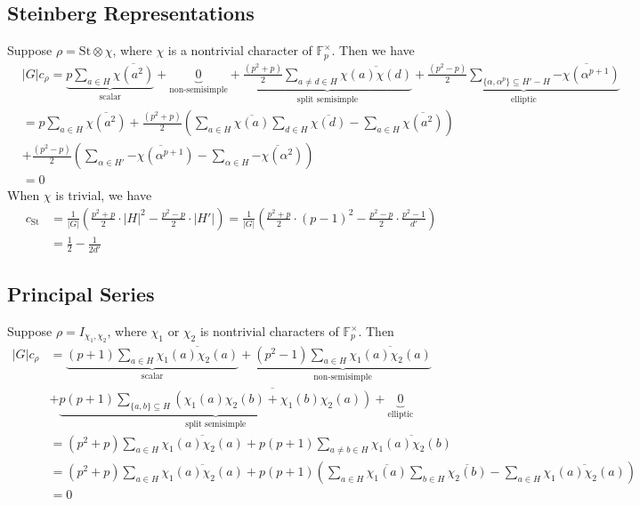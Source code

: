 \documentclass[12pt,reqno]{amsart}
\theoremstyle{plain}
\theoremstyle{definition}
\theoremstyle{remark}
\newcommand{\FF}{\mathbb{F}}
\begin{document}
\subsection{Steinberg Representations}
 Suppose $\rho = \mathrm{St}\otimes \chi$, where $\chi$ is a nontrivial character of $\FF_p^\times$. Then we have 
 \begin{align*}
     & |G|c_{\rho} =  \underbrace{p \sum_{a \in H} \overline{\chi(a^2)}}_{\text{scalar}}+\underbrace{0}_{\text{non-semisimple}}+ \underbrace{\frac{(p^2+p)}{2} \sum_{a \neq d  \in H} \overline{\chi(a) \chi(d)}}_{\text{split semisimple}} + \underbrace{\frac{(p^2-p)}{2} \sum_{\{\alpha, \alpha^p\} \subseteq H'-H}  \overline{-\chi(\alpha^{p+1})}}_{\text{elliptic}} \\
     &=   p \sum_{a \in H} \overline{\chi(a^2)} +  \frac{(p^2+p)}{2}\left( \sum_{a  \in H} \overline{\chi(a)} \sum_{d \in H} \overline{\chi(d)}  - \sum_{a  \in H} \overline{\chi(a^2)} \right)\\ &+ \frac{(p^2-p)}{2} \left( \sum_{\alpha \in H'}  \overline{-\chi(\alpha^{p+1})}- \sum_{\alpha \in H}  \overline{-\chi(\alpha^2)}\right) \\
     &=0
 \end{align*}
 When $\chi$ is trivial, we have
\begin{align*}
      c_{\mathrm{St}} &=\frac{1}{|G|} \left( \frac{p^2+p}{2}\cdot |H|^2-\frac{p^2-p}{2}\cdot |H'|\right)= \frac{1}{|G|} \left(\frac{p^2+p}{2}\cdot (p-1)^2-\frac{p^2-p}{2}\cdot\frac{p^2-1}{d'}\right)\\&= \frac{1}{2}-\frac{1}{2d'}
\end{align*}
 \subsection{Principal Series} Suppose $\rho= I_{\chi_1, \chi_2}$, where $\chi_1$ or $\chi_2$ is nontrivial characters of $\FF_p^\times$. Then 
 \begin{align*}
      |G|c_{\rho} &=  \underbrace{(p+1) \sum_{a \in H} \overline{\chi_1(a)\chi_2(a)}}_{\text{scalar}} + \underbrace{(p^2-1) \sum_{a\in H} \overline{\chi_1(a)\chi_2(a)}}_{\text{non-semisimple}}\\&+ \underbrace{p(p+1)\sum_{\{a,b\} \subseteq H} \overline{(\chi_1(a)\chi_2(b) + \chi_1(b) \chi_2(a)) } }_{\text{split semisimple}} + \underbrace{0}_{\text{elliptic}}\\
     &= (p^2+p) \sum_{a\in H} \overline{\chi_1(a)\chi_2(a)} +  p(p+1)\sum_{a \neq b \in H} \overline{\chi_1(a)\chi_2(b)}   \\
     &=(p^2+p) \sum_{a\in H} \overline{\chi_1(a)\chi_2(a)} +  p(p+1)\left(\sum_{a \in H} \overline{\chi_1(a)} \sum_{b \in H} \overline{\chi_2(b)} - \sum_{a \in H} \overline{\chi_1(a)\chi_2(a)}   \right)\\ &=0\\
 \end{align*}
\end{document}
